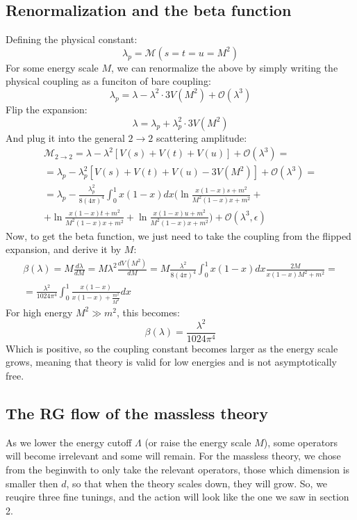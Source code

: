 \documentclass{article}
\begin{document}
\subsection{Renormalization and the beta function}
Defining the physical constant:
\begin{equation}
    \lambda_p = \mathcal{M}(s = t = u = M^2)
\end{equation}
For some energy scale $M$, we can renormalize the above by simply writing the physical coupling as a funciton of bare coupling:
\begin{equation}
    \lambda_p = \lambda - \lambda^2\cdot 3V(M^2) + \mathcal{O}(\lambda^3)
\end{equation}
Flip the expansion:
\begin{equation}
    \lambda = \lambda_p + \lambda_p^2\cdot 3V(M^2)
\end{equation}
And plug it into the general $2\rightarrow2$ scattering amplitude:
\begin{equation}
\begin{gathered}
    \mathcal{M}_{2\rightarrow2} = \lambda - \lambda^2\left[V(s) + V(t) + V(u)\right] + \mathcal{O}(\lambda^3) = \\ = \lambda_p - \lambda_p^2\left[V(s) + V(t) + V(u) - 3V(M^2)\right] + \mathcal{O}(\lambda^3) = \\ = \lambda_p - \frac{\lambda_p^2}{8(4\pi)^4}\int_0^1 x(1 - x)dx\Bigg(\ln\frac{x(1-x)s + m^2}{M^2(1 - x)x + m^2} + \\ + \ln\frac{x(1-x)t + m^2}{M^2(1 - x)x + m^2} + \ln\frac{x(1-x)u + m^2}{M^2(1 - x)x + m^2}\Bigg) + \mathcal{O}(\lambda^3, \epsilon)
\end{gathered}
\end{equation}
Now, to get the beta function, we just need to take the coupling from the flipped expansion, and derive it by $M$:
\begin{equation}
\begin{gathered}
    \beta(\lambda) = M \frac{d\lambda}{dM} = M\lambda^2\frac{dV(M^2)}{dM} = M\frac{\lambda^2}{8(4\pi)^4} \int_0^1x(1 - x) dx \frac{2M}{x(1 - x)M^2 + m^2} = \\ =
    \frac{\lambda^2}{1024\pi^4} \int_0^1 \frac{x(1 - x)}{x(1 - x) + \frac{m^2}{M^2}} dx
\end{gathered}
\end{equation}
For high energy $M^2 \gg m^2$, this becomes:
\begin{equation}
    \beta(\lambda) = \frac{\lambda^2}{1024\pi^4}
\end{equation}
Which is positive, so the coupling constant becomes larger as the energy scale grows, meaning that theory is valid for low energies and is not asymptotically free.
\subsection{The RG flow of the massless theory}
As we lower the energy cutoff $\Lambda$ (or raise the energy scale $M$), some operators will become irrelevant and some will remain. For the massless theory, we chose from the beginwith to only take the relevant operators, those which dimension is smaller then $d$, so that when the theory scales down, they will grow. So, we reuqire three fine tunings, and the action will look like the one we saw in section 2.
\end{document}
